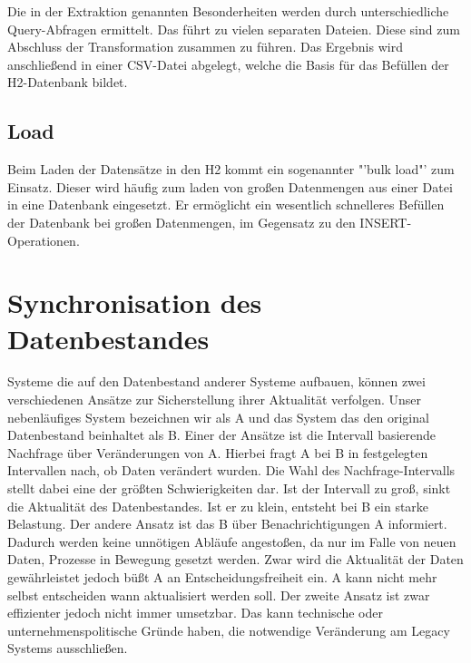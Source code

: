 Die in der Extraktion genannten Besonderheiten werden durch unterschiedliche Query-Abfragen ermittelt. Das führt zu vielen separaten Dateien. Diese sind zum Abschluss der Transformation zusammen zu führen. Das Ergebnis wird anschließend in einer CSV-Datei abgelegt, welche die Basis für das Befüllen der H2-Datenbank bildet. 

\subsection{Load}

Beim Laden der Datensätze in den H2 kommt ein sogenannter "'bulk load"' zum Einsatz. Dieser wird häufig zum laden von großen Datenmengen aus einer Datei in eine Datenbank eingesetzt. Er ermöglicht ein wesentlich schnelleres Befüllen der Datenbank bei großen Datenmengen, im Gegensatz zu den INSERT-Operationen.

\section{Synchronisation des Datenbestandes}
\label{ch:Konzeption:sec:updatedatenbestand}

Systeme die auf den Datenbestand anderer Systeme aufbauen, können zwei verschiedenen Ansätze zur Sicherstellung ihrer Aktualität verfolgen. Unser nebenläufiges System bezeichnen wir als A und das System das den original Datenbestand beinhaltet als B. Einer der Ansätze ist die Intervall basierende Nachfrage über Veränderungen von A. Hierbei fragt A bei B in festgelegten Intervallen nach, ob Daten verändert wurden. Die Wahl des Nachfrage-Intervalls stellt dabei eine der größten Schwierigkeiten dar. Ist der Intervall zu groß, sinkt die Aktualität des Datenbestandes. Ist er zu klein, entsteht bei B ein starke Belastung. Der andere Ansatz ist das B über Benachrichtigungen A informiert. Dadurch werden keine unnötigen Abläufe angestoßen, da nur im Falle von neuen Daten, Prozesse in Bewegung gesetzt werden. Zwar wird die Aktualität der Daten gewährleistet jedoch büßt A an Entscheidungsfreiheit ein. A kann nicht mehr selbst entscheiden wann aktualisiert werden soll. Der zweite Ansatz ist zwar effizienter jedoch nicht immer umsetzbar. Das kann technische oder unternehmenspolitische Gründe haben, die notwendige Veränderung am Legacy Systems ausschließen.  

